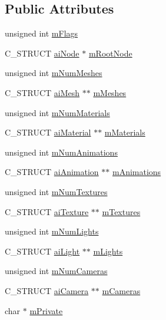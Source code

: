 \subsection*{Public Attributes}
\begin{DoxyCompactItemize}
\item 
unsigned int \hyperlink{structai_scene_a4091f10bb81e05db00ebc34f40c48f38}{m\+Flags}
\item 
C\+\_\+\+S\+T\+R\+U\+C\+T \hyperlink{structai_node}{ai\+Node} $\ast$ \hyperlink{structai_scene_ad0e9a7e68f2ed6b3120a7c19ef20307a}{m\+Root\+Node}
\item 
unsigned int \hyperlink{structai_scene_a1a6c1abca994c54381a28cc151e5fa4f}{m\+Num\+Meshes}
\item 
C\+\_\+\+S\+T\+R\+U\+C\+T \hyperlink{structai_mesh}{ai\+Mesh} $\ast$$\ast$ \hyperlink{structai_scene_ad1c7000f0f28ea747868db9f94d32a3d}{m\+Meshes}
\item 
unsigned int \hyperlink{structai_scene_a4277d8bffe8b8f568098af6c31d042b7}{m\+Num\+Materials}
\item 
C\+\_\+\+S\+T\+R\+U\+C\+T \hyperlink{classai_material}{ai\+Material} $\ast$$\ast$ \hyperlink{structai_scene_a52bc7089a5b943ad7c7c386e616df35e}{m\+Materials}
\item 
unsigned int \hyperlink{structai_scene_aa2af030ec218ead0dc062b6a96a7471a}{m\+Num\+Animations}
\item 
C\+\_\+\+S\+T\+R\+U\+C\+T \hyperlink{structai_animation}{ai\+Animation} $\ast$$\ast$ \hyperlink{structai_scene_ab76fb8f38c2e7365ccce42d565b62b25}{m\+Animations}
\item 
unsigned int \hyperlink{structai_scene_a0d61a5439edd7223097b48aea57c47dd}{m\+Num\+Textures}
\item 
C\+\_\+\+S\+T\+R\+U\+C\+T \hyperlink{structai_texture}{ai\+Texture} $\ast$$\ast$ \hyperlink{structai_scene_a0fd0d29fbc439e3715b4975ccb68d2d3}{m\+Textures}
\item 
unsigned int \hyperlink{structai_scene_a0c90fc5f15b979e0bb0d3e8f1e246307}{m\+Num\+Lights}
\item 
C\+\_\+\+S\+T\+R\+U\+C\+T \hyperlink{structai_light}{ai\+Light} $\ast$$\ast$ \hyperlink{structai_scene_a2e64a69ade81cae0b3901bea90b6bb47}{m\+Lights}
\item 
unsigned int \hyperlink{structai_scene_a4abc432e1b22a7e01553f33c79c0592f}{m\+Num\+Cameras}
\item 
C\+\_\+\+S\+T\+R\+U\+C\+T \hyperlink{structai_camera}{ai\+Camera} $\ast$$\ast$ \hyperlink{structai_scene_a71e7d204d96969ca4f5a931f4d636f1e}{m\+Cameras}
\item 
char $\ast$ \hyperlink{structai_scene_adc5fcf5c4ef86a45f721560d6c1a4923}{m\+Private}
\end{DoxyCompactItemize}
